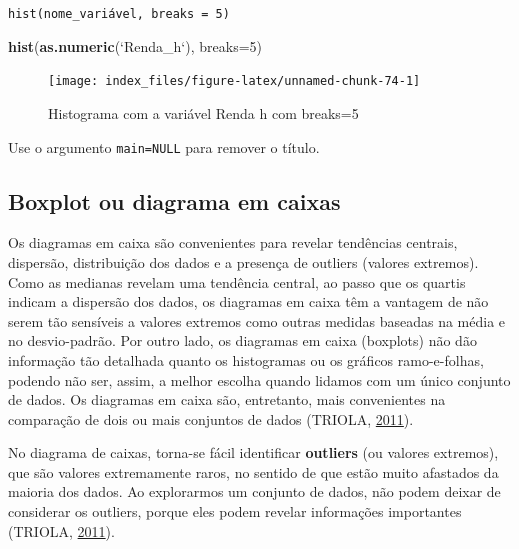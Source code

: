 \documentclass[12pt,brazil,oneside]{book}
\newenvironment{Shaded}{\begin{snugshade}}{\end{snugshade}}
\newcommand{\DataTypeTok}[1]{\textcolor[rgb]{0.13,0.29,0.53}{#1}}
\newcommand{\DecValTok}[1]{\textcolor[rgb]{0.00,0.00,0.81}{#1}}
\newcommand{\KeywordTok}[1]{\textcolor[rgb]{0.13,0.29,0.53}{\textbf{#1}}}
\newcommand{\NormalTok}[1]{#1}
\newcommand{\StringTok}[1]{\textcolor[rgb]{0.31,0.60,0.02}{#1}}
\begin{document}
\texttt{hist(nome\_variável,\ breaks\ =\ 5)}

\begin{Shaded}
\begin{Highlighting}[]
\KeywordTok{hist}\NormalTok{(}\KeywordTok{as.numeric}\NormalTok{(}\StringTok{`}\DataTypeTok{Renda_h}\StringTok{`}\NormalTok{), }\DataTypeTok{breaks=}\DecValTok{5}\NormalTok{)}
\end{Highlighting}
\end{Shaded}

\begin{figure}[H]

{\centering \texttt{[image: index\_files/figure-latex/unnamed-chunk-74-1]} 

}

\caption{Histograma com a variável Renda h com breaks=5}\label{fig:unnamed-chunk-74}
\end{figure}

Use o argumento \texttt{main=NULL} para remover o título.

\hypertarget{boxplot-ou-diagrama-em-caixas}{%
\subsection{Boxplot ou diagrama em
caixas}\label{boxplot-ou-diagrama-em-caixas}}

Os diagramas em caixa são convenientes para revelar tendências centrais,
dispersão, distribuição dos dados e a presença de outliers (valores
extremos). Como as medianas revelam uma tendência central, ao passo que
os quartis indicam a dispersão dos dados, os diagramas em caixa têm a
vantagem de não serem tão sensíveis a valores extremos como outras
medidas baseadas na média e no desvio-padrão. Por outro lado, os
diagramas em caixa (boxplots) não dão informação tão detalhada quanto os
histogramas ou os gráficos ramo-e-folhas, podendo não ser, assim, a
melhor escolha quando lidamos com um único conjunto de dados. Os
diagramas em caixa são, entretanto, mais convenientes na comparação de
dois ou mais conjuntos de dados (TRIOLA,
\protect\hyperlink{ref-triola1999}{2011}).

No diagrama de caixas, torna-se fácil identificar \textbf{outliers} (ou
valores extremos), que são valores extremamente raros, no sentido de que
estão muito afastados da maioria dos dados. Ao explorarmos um conjunto
de dados, não podem deixar de considerar os outliers, porque eles podem
revelar informações importantes (TRIOLA,
\protect\hyperlink{ref-triola1999}{2011}).
\end{document}
